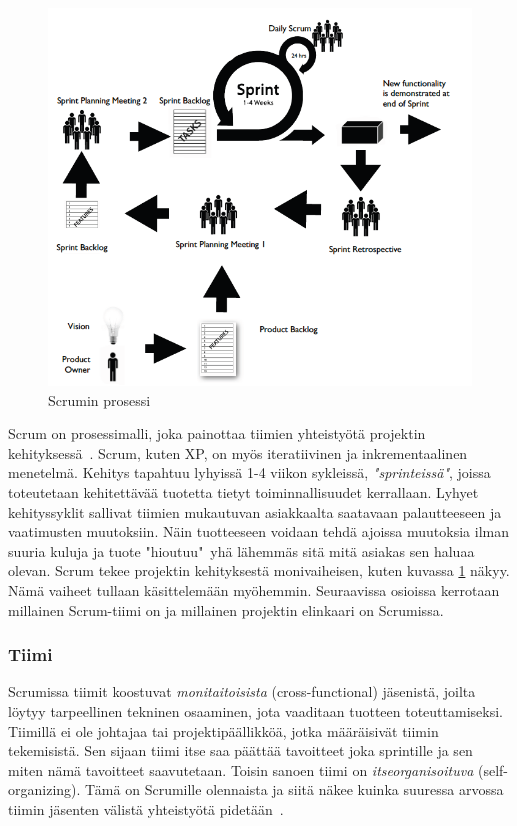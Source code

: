 \documentclass[finnish]{../tktltiki2}
\theoremstyle{definition}
\theoremstyle{remark}
\begin{document}
\begin{figure}[ht]
     \includegraphics{scrum.png}
     \caption{Scrumin prosessi~\cite{Scrumprimer}}\label{scrumprocess}
\end{figure}

Scrum on prosessimalli, joka painottaa tiimien yhteistyötä projektin 
kehityksessä~\cite{ScrumORG}. Scrum, kuten XP, on myös iteratiivinen 
ja inkrementaalinen menetelmä.
Kehitys tapahtuu lyhyissä 1-4 viikon sykleissä, 
\emph{"sprinteissä"}, joissa toteutetaan kehitettävää tuotetta tietyt 
toiminnallisuudet kerrallaan. Lyhyet kehityssyklit sallivat tiimien 
mukautuvan asiakkaalta saatavaan palautteeseen ja vaatimusten 
muutoksiin. Näin tuotteeseen voidaan tehdä ajoissa
muutoksia ilman suuria kuluja ja tuote "hioutuu"~yhä lähemmäs sitä 
mitä asiakas sen haluaa olevan. Scrum tekee projektin kehityksestä
monivaiheisen, kuten kuvassa \ref{scrumprocess} näkyy. Nämä vaiheet tullaan käsittelemään myöhemmin. Seuraavissa osioissa kerrotaan millainen Scrum-tiimi
on ja millainen projektin elinkaari on Scrumissa.

\subsubsection{Tiimi}

Scrumissa tiimit koostuvat \emph{monitaitoisista} (cross-functional) 
jäsenistä, joilta löytyy tarpeellinen tekninen osaaminen, jota 
vaaditaan
tuotteen toteuttamiseksi. Tiimillä ei ole johtajaa tai 
projektipäällikköä, jotka määräisivät tiimin tekemisistä. Sen sijaan 
tiimi itse
saa päättää tavoitteet joka sprintille ja sen miten nämä tavoitteet 
saavutetaan. Toisin sanoen tiimi on \emph{itseorganisoituva}
(self-organizing). Tämä on Scrumille olennaista ja siitä näkee 
kuinka suuressa arvossa tiimin jäsenten välistä yhteistyötä 
pidetään~\cite{ScrumHandBook}.
\end{document}
